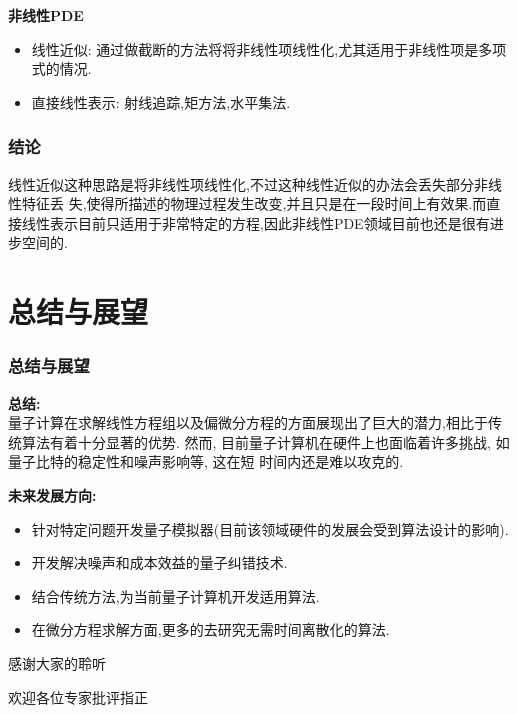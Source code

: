 \documentclass{beamer}
\begin{document}
\begin{spacing}{1.2}
{\begin{frame}
        \vspace{20pt}
        \textbf{非线性PDE}
        \begin{itemize}
        \item 线性近似: 通过做截断的方法将将非线性项线性化,尤其适用于非线性项是多项式的情况.
        \item 直接线性表示: 射线追踪,矩方法,水平集法.
         \end{itemize}              
     \end{frame}
    \begin{frame}
    	 \frametitle{结论}
		线性近似这种思路是将非线性项线性化,不过这种线性近似的办法会丢失部分非线性特征丢
		失,使得所描述的物理过程发生改变,并且只是在一段时间上有效果.而直接线性表示目前只适用于非常特定的方程,因此非线性PDE领域目前也还是很有进步空间的.
	\end{frame}
	
    \section{总结与展望}
      \begin{frame}
    \frametitle{总结与展望}
     \textbf{总结:}\\
     量子计算在求解线性方程组以及偏微分方程的方面展现出了巨大的潜力,相比于传统算法有着十分显著的优势.
     然而, 目前量子计算机在硬件上也面临着许多挑战, 如量子比特的稳定性和噪声影响等, 这在短
     时间内还是难以攻克的. 
     
    \vspace{20pt}
     \textbf{未来发展方向:}
    	\begin{itemize}
    		\item 针对特定问题开发量子模拟器(目前该领域硬件的发展会受到算法设计的影响).
    		\item 开发解决噪声和成本效益的量子纠错技术.
    		\item 结合传统方法,为当前量子计算机开发适用算法.
    		\item 在微分方程求解方面,更多的去研究无需时间离散化的算法.		
    	\end{itemize}
\end{frame}
}

{
\begin{frame}
	\centering
	\Huge{感谢大家的聆听}
	
	\vspace{1cm}

	\normalsize{欢迎各位专家批评指正}
\end{frame}}
\end{spacing}
\end{document}
